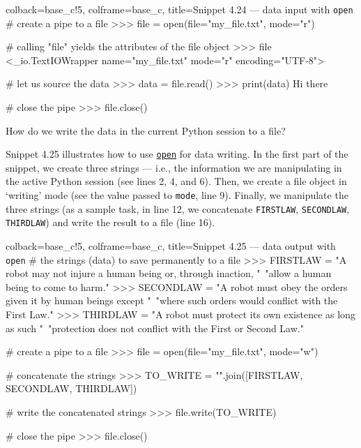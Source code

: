 \documentclass[a4paper,11pt]{book}
\numberwithin{figure}{chapter}
\numberwithin{table}{chapter}
\newcommand{\question}[1]{%
    \begin{tcolorbox}[colback=comp_c!10,colframe=comp_c,sidebyside align=top,width=\linewidth,before skip=1ex]
        #1
    \end{tcolorbox}%
    \switchcolumn%
}
\newcommand{\note}[1]{%
    \begin{tcolorbox}[colback=white!0,colframe=white!10,width=\linewidth,before skip=1ex]
        #1
    \end{tcolorbox}         
}
\begin{document}
\begin{pythoncode}[linenos=true,]{colback=base_c!5, colframe=base_c, title=\sffamily Snippet 4.24 --- data input with \texttt{open}}
# create a pipe to a file
>>> file = open(file="my_file.txt", mode="r")

# calling "file" yields the attributes of the file object
>>> file
<_io.TextIOWrapper name="my_file.txt" mode="r" encoding="UTF-8">

# let us source the data
>>> data = file.read()
>>> print(data)
Hi there

# close the pipe
>>> file.close()
\end{pythoncode}
\clearpage 

\begin{paracol}{2}
\question{\raggedright How do we write the data in the current Python session to a file?}
\note{Snippet 4.25 illustrates how to use \href{https://docs.python.org/3/library/functions.html#open}{\texttt{open}} for data writing. In the first part of the snippet, we create three strings --- i.e., the information we are manipulating in the active Python session (see lines 2, 4, and 6). Then, we create a file object in `writing' mode (see the value passed to \texttt{mode}, line 9). Finally, we manipulate the three strings (as a sample task, in line 12, we concatenate \texttt{FIRSTLAW}, \texttt{SECONDLAW}, \texttt{THIRDLAW}) and write the result to a file (line 16).}
\end{paracol}

\begin{pythoncode}[linenos=true,]{colback=base_c!5, colframe=base_c, title=\sffamily Snippet 4.25 --- data output with \texttt{open}}
# the strings (data) to save permanently to a file
>>> FIRSTLAW = "A robot may not injure a human being or, through inaction, "\
	       "allow a human being to come to harm."
>>> SECONDLAW = "A robot must obey the orders given it by human beings except "\
	       "where such orders would conflict with the First Law."
>>> THIRDLAW = "A robot must protect its own existence as long as such "\
               "protection does not conflict with the First or Second Law."

# create a pipe to a file
>>> file = open(file="my_file.txt", mode="w")

# concatenate the strings
>>> TO_WRITE = "\n".join([FIRSTLAW, SECONDLAW, THIRDLAW])

# write the concatenated strings 
>>> file.write(TO_WRITE)

# close the pipe
>>> file.close()
\end{pythoncode}
	
\end{document}
